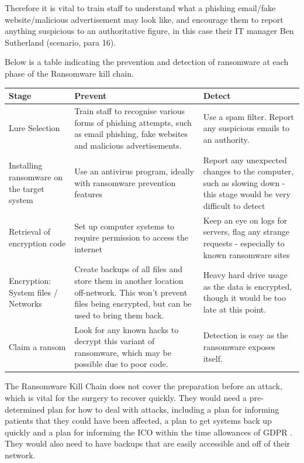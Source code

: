 \documentclass[12pt,a4paper]{article}
\begin{document}
Therefore it is vital to train staff to understand what a phishing email/fake website/malicious advertisement may look like, and encourage them to report anything suspicious to an authoritative figure, in this case their IT manager Ben Sutherland (scenario, para 16).

Below is a table indicating the prevention and detection of ransomware at each phase of the Ransomware kill chain.

\begin{center}
\begin{longtable}{ |p{}|p{}|p{}| } 
 \hline
 \textbf{Stage} & \textbf{Prevent} & \textbf{Detect} \\ 
  \hline
 Lure Selection & Train staff to recognise various forms of phishing attempts, such as email phishing, fake websites and malicious advertisements. & Use a spam filter. Report any suspicious emails to an authority. \\ 
  \hline
 Installing ransomware on the target system & Use an antivirus program, ideally with ransomware prevention features & Report any unexpected changes to the computer, such as slowing down - this stage would be very difficult to detect \\ 
 \hline
 Retrieval of encryption code & Set up computer systems to require permission to access the internet & Keep an eye on logs for servers, flag any strange requests - especially to known ransomware sites \\ 
 \hline
 Encryption: System files / Networks & Create backups of all files and store them in another location off-network. This won't prevent files being encrypted, but can be used to bring them back. & Heavy hard drive usage as the data is encrypted, though it would be too late at this point. \\ 
 \hline
 Claim a ransom & Look for any known hacks to decrypt this variant of ransomware, which may be possible due to poor code. & Detection is easy as the ransomware exposes itself. \\ 
 \hline
\end{longtable}
\caption{\textit{Table 4: Preventing and detecting ransomware}}
\end{center}

The Ransomware Kill Chain does not cover the preparation before an attack, which is vital for the surgery to recover quickly. They would need a pre-determined plan for how to deal with attacks, including a plan for informing patients that they could have been affected, a plan to get systems back up quickly and a plan for informing the ICO within the time allowances of GDPR \cite{ICO}. They would also need to have backups that are easily accessible and off of their network.
\end{document}
